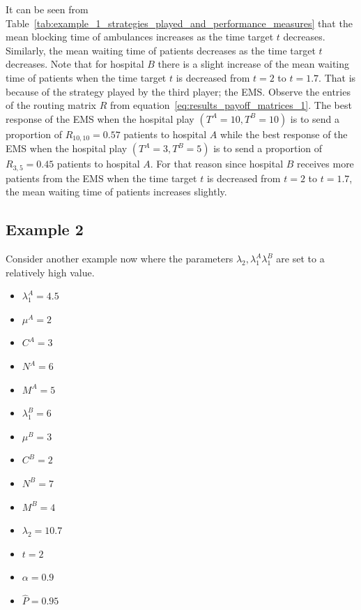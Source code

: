 It can be seen from
Table~\ref{tab:example_1_strategies_played_and_performance_measures} that the
mean blocking time of ambulances increases as the time target \(t\) decreases.
Similarly, the mean waiting time of patients decreases as the time target \(t\)
decreases.
Note that for hospital \(B\) there is a slight increase of the mean waiting time
of patients when the time target \(t\) is decreased from \(t = 2\) to
\(t = 1.7\).
That is because of the strategy played by the third player; the EMS.
Observe the entries of the routing matrix \(R\) from
equation~\eqref{eq:results_payoff_matrices_1}.
The best response of the EMS when the hospital play \((T^A=10, T^B=10)\) is
to send a proportion of \(R_{10, 10} = 0.57\) patients to hospital \(A\)
while the best response of the EMS when the hospital play \((T^A=3, T^B=5)\)
is to send a proportion of \(R_{3, 5} = 0.45\) patients to hospital \(A\).
For that reason since hospital \(B\) receives more patients from the EMS when
the time target \(t\) is decreased from \(t = 2\) to \(t = 1.7\), the mean 
waiting time of patients increases slightly.


\subsection{Example 2}

Consider another example now where the parameters \(\lambda_2, \lambda_1^A
\lambda_1^B\) are set to a relatively high value.

\begin{minipage}{\linewidth}
\begin{multicols}{3}
    \begin{itemize}
        \item \( \lambda_1^A = 4.5 \)
        \item \( \mu^A = 2 \)
        \item \( C^A = 3 \)
        \item \( N^A = 6 \)
        \item \( M^A = 5 \)
        \columnbreak

        \item \( \lambda_1^B = 6 \)
        \item \( \mu^B = 3 \)
        \item \( C^B = 2 \)
        \item \( N^B = 7 \)
        \item \( M^B = 4 \)
        \columnbreak

        \item \( \lambda_2 = 10.7 \)
        \item \( t = 2 \)
        \item \( \alpha = 0.9 \)
        \item \( \hat{P} = 0.95 \)
    \end{itemize}
\end{multicols}
\end{minipage}

